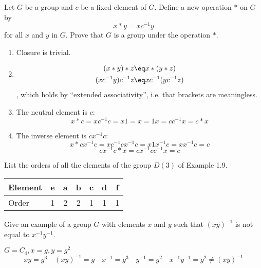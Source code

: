 \begin{exercise}
    Let \(G\) be a group and \(c\) be a fixed element of \(G\). Define a new operation \(*\) on \(G\) by
    \[x * y = xc^{ - 1}y\]
    for all \(x\) and \(y\) in \(G\). Prove that \(G\) is a group under the operation \(*\).
\end{exercise}
\begin{solution}\itemfix
    \begin{enumerate}
        \item Closure is trivial.
        \item \begin{align*}
                  (x * y) * z     & \eq x * (y * z)     \\
                  (xc^{ - 1}y) c^{ - 1} z & \eq xc^{ - 1} (yc^{ - 1} z) \\
              \end{align*}
              , which holds by ``extended associativity'', i.e. that brackets are meaningless.
        \item The neutral element is \(c\):
         \[x * c = x c^{ - 1}c = x 1 = x = 1 x = c c^{ - 1} x = c * x\]
        \item The inverse element is \(c x^{ - 1} c\):
         \[x * c x^{ - 1} c = x c^{ - 1} c x^{ - 1} c = x 1 x^{ - 1} c = x x^{ - 1} c = c\]
         \[c x^{ - 1} c * x = c x^{ - 1} c c^{ - 1} x = c\]
    \end{enumerate}
\end{solution}

\begin{exercise}
    List the orders of all the elements of the group \(D(3)\) of Example 1.9.
\end{exercise}
\begin{solution}\itemfix
    \begin{center}
        \begin{tabular}{l|C|C|C|C|C|C}
            Element & e & a & b & c & d & f \\ \hline
            Order   & 1 & 2 & 2 & 1 & 1 & 1
        \end{tabular}
    \end{center}
\end{solution}

\begin{exercise}
    Give an example of a group \(G\) with elements \(x\) and \(y\) such that \((xy)^{ - 1}\) is not equal to \(x^{ - 1}y^{ - 1}\).
\end{exercise}
\begin{solution}
    \(G = C_4, x = g, y = g^2\)
    \[xy = g^3 \quad (xy)^{ - 1} = g \quad x^{ - 1} = g^3 \quad y^{ - 1} = g^2 \quad x^{ - 1}y^{ - 1} = g^2 \neq (xy)^{ - 1}\]
\end{solution}

